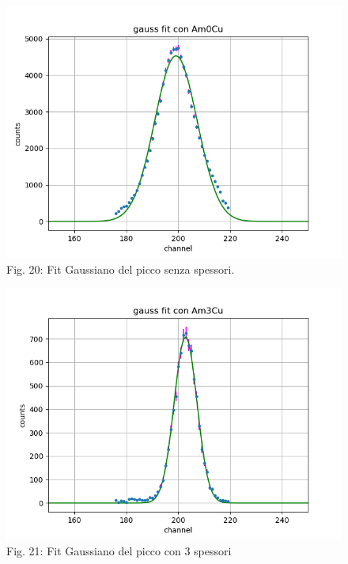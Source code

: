 \documentclass[a4paper]{article}
\begin{document}
\begin{figure}[H]
	\includegraphics[width=1\textwidth]{gauss_fit_con_Am0Cutext}
        \caption{Fig. 20: Fit Gaussiano del picco senza spessori.}
        \end{figure}
        \label{fig:20} 
        \begin{figure}
        
            
	\includegraphics[width=1\textwidth]{gauss_fit_con_Am3Cutext}
        \caption{Fig. 21: Fit Gaussiano del picco con 3 spessori}
        \label{fig:21}
        

\end{figure}
\end{document}
